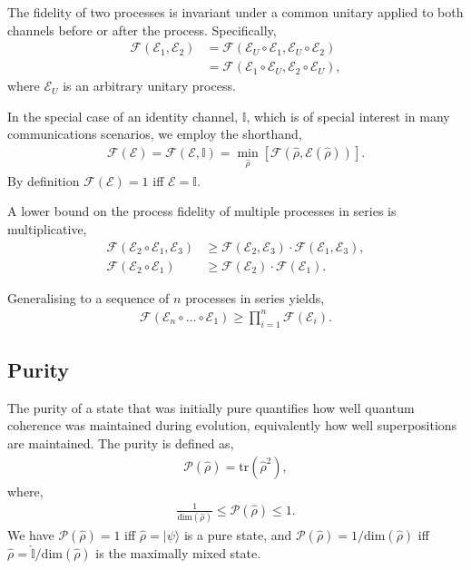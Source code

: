 \documentclass[aps,rmp,twocolumn,amsmath,amssymb,nofootinbib,superscriptaddress]{revtex4}
\newcommand{\ket}[1]{|#1\rangle}
\begin{document}
The fidelity of two processes is invariant under a common unitary applied to both channels before or after the process. Specifically,
\begin{align}
\mathcal{F}(\mathcal{E}_1,\mathcal{E}_2) &= \mathcal{F}(\mathcal{E}_U\circ\mathcal{E}_1,\mathcal{E}_U\circ\mathcal{E}_2) \nonumber \\
&= \mathcal{F}(\mathcal{E}_1\circ \mathcal{E}_U,\mathcal{E}_2\circ \mathcal{E}_U),
\end{align}
where $\mathcal{E}_U$ is an arbitrary unitary process.

In the special case of an identity channel, $\mathbb{I}$, which is of special interest in many communications scenarios, we employ the shorthand,
\begin{align}
\mathcal{F}(\mathcal{E}) = \mathcal{F}(\mathcal{E},\mathbb{I}) = \min_{\hat\rho} \left[\mathcal{F}(\hat\rho,\mathcal{E}(\hat\rho))\right].
\end{align}
By definition \mbox{$\mathcal{F}(\mathcal{E})=1$} iff \mbox{$\mathcal{E}=\mathbb{I}$}.

A lower bound on the process fidelity of multiple processes in series is multiplicative,
\begin{align}
\mathcal{F}(\mathcal{E}_2\circ\mathcal{E}_1,\mathcal{E}_3) &\geq \mathcal{F}(\mathcal{E}_2,\mathcal{E}_3)\cdot\mathcal{F}(\mathcal{E}_1,\mathcal{E}_3), \nonumber \\
\mathcal{F}(\mathcal{E}_2\circ\mathcal{E}_1) &\geq \mathcal{F}(\mathcal{E}_2)\cdot\mathcal{F}(\mathcal{E}_1).
\end{align}

Generalising to a sequence of $n$ processes in series yields,
\begin{align}
\mathcal{F}(\mathcal{E}_n\circ\dots\circ\mathcal{E}_1) \geq \prod_{i=1}^n \mathcal{F}(\mathcal{E}_i).
\end{align}

%
%

\subsection{Purity}

The purity of a state that was initially pure quantifies how well quantum coherence was maintained during evolution, equivalently how well superpositions are maintained. The purity is defined as,
\begin{align}
\mathcal{P}(\hat\rho) = \mathrm{tr}(\hat\rho^2),
\end{align}
where,
\begin{align}
\frac{1}{\mathrm{dim}(\hat\rho)} \leq \mathcal{P}(\hat\rho) \leq 1.
\end{align}
We have \mbox{$\mathcal{P}(\hat\rho) = 1$} iff \mbox{$\hat\rho=\ket{\psi}$} is a pure state, and \mbox{$\mathcal{P}(\hat\rho)=1/\mathrm{dim}(\hat\rho)$} iff \mbox{$\hat\rho=\mathbb{\hat{I}}/\mathrm{dim}(\hat\rho)$} is the maximally mixed state.
\end{document}
